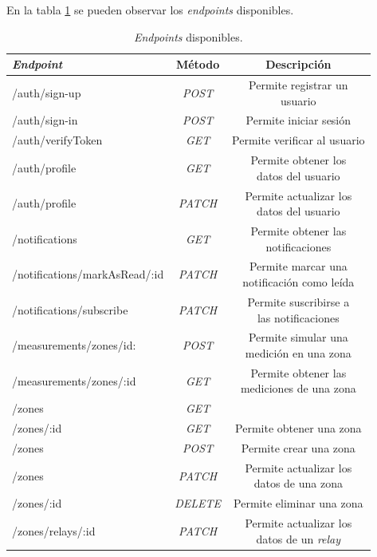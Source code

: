 En la tabla \ref{tab:tablaEndpointsBackend} se pueden observar los \textit{endpoints} disponibles.

\begin{table}[H]
	\centering
	\caption[\textit{Endpoints} disponibles]{\textit{Endpoints} disponibles.}
	\begin{tabular}{l c c}    
		\toprule
		\textbf{\emph{Endpoint}} & \textbf{Método} & \textbf{Descripción}\\
		\midrule
		/auth/sign-up & \emph{POST} & \shortstack{Permite registrar un  \\ usuario} \\
		/auth/sign-in & \emph{POST} & Permite iniciar sesión \\
		/auth/verifyToken & \emph{GET} & Permite verificar al usuario \\
		/auth/profile & \emph{GET} & \shortstack{Permite obtener los \\ datos del usuario} \\
		/auth/profile & \emph{PATCH} & \shortstack{Permite actualizar los \\ datos del usuario} \\
		/notifications & \emph{GET} & \shortstack{Permite obtener las \\ notificaciones} \\
		/notifications/markAsRead/:id & \emph{PATCH} & \shortstack{Permite marcar una \\ notificación como leída } \\
		/notifications/subscribe & \emph{PATCH} & \shortstack{Permite suscribirse a \\ las notificaciones } \\
		/measurements/zones/id: & \emph{POST} & \shortstack{Permite simular una \\ medición en una zona} \\
		/measurements/zones/:id & \emph{GET} &  \shortstack{Permite obtener las \\ mediciones de una zona } \\
		/zones & \emph{GET} & \shortstack{Permite obtener las zonas } \\
		/zones/:id & \emph{GET} & Permite obtener una zona \\
		/zones & \emph{POST} & Permite crear una zona \\
		/zones & \emph{PATCH} & \shortstack{Permite actualizar los \\  datos de una zona } \\
		/zones/:id & \emph{DELETE} & Permite eliminar una zona \\
		/zones/relays/:id & \emph{PATCH} & \shortstack{Permite actualizar los \\  datos de un \emph{relay} } \\
		\bottomrule
		\hline
	\end{tabular}
	\label{tab:tablaEndpointsBackend}
\end{table}

